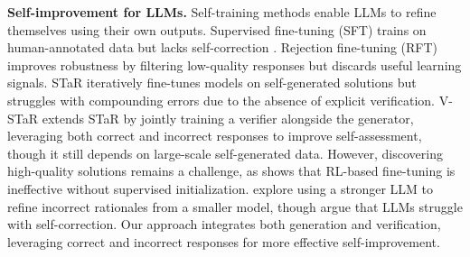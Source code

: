 \textbf{Self-improvement for LLMs.} Self-training methods enable LLMs to refine themselves using their own outputs. Supervised fine-tuning (SFT) \citep{brown2020lmfewshot} trains on human-annotated data but lacks self-correction \citep{huang2023large}. Rejection fine-tuning (RFT) \citep{yuan2023scaling} improves robustness by filtering low-quality responses but discards useful learning signals. STaR \citep{zelikman2022star} iteratively fine-tunes models on self-generated solutions but struggles with compounding errors due to the absence of explicit verification. V-STaR \citep{hosseini2024vstar} extends STaR by jointly training a verifier alongside the generator, leveraging both correct and incorrect responses to improve self-assessment, though it still depends on large-scale self-generated data. However, discovering high-quality solutions remains a challenge, as \citep{luong2024reft} shows that RL-based fine-tuning is ineffective without supervised initialization. \citet{kim2024speculative} explore using a stronger LLM to refine incorrect rationales from a smaller model, though \citet{huang2024correctyet} argue that LLMs struggle with self-correction. Our approach integrates both generation and verification, leveraging correct and incorrect responses for more effective self-improvement.

